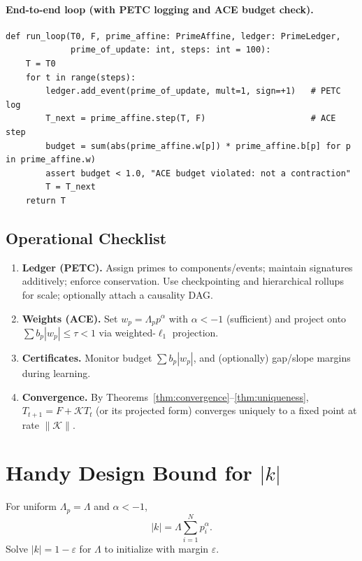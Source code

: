 \documentclass[11pt]{article}
\theoremstyle{plain}
\theoremstyle{definition}
\theoremstyle{remark}
\begin{document}
\paragraph{End-to-end loop (with PETC logging and ACE budget check).}
\begin{verbatim}
def run_loop(T0, F, prime_affine: PrimeAffine, ledger: PrimeLedger,
             prime_of_update: int, steps: int = 100):
    T = T0
    for t in range(steps):
        ledger.add_event(prime_of_update, mult=1, sign=+1)   # PETC log
        T_next = prime_affine.step(T, F)                     # ACE step
        budget = sum(abs(prime_affine.w[p]) * prime_affine.b[p] for p in prime_affine.w)
        assert budget < 1.0, "ACE budget violated: not a contraction"
        T = T_next
    return T
\end{verbatim}

\subsection{Operational Checklist}
\begin{enumerate}
  \item \textbf{Ledger (PETC).} Assign primes to components/events; maintain signatures additively; enforce conservation. Use checkpointing and hierarchical rollups for scale; optionally attach a causality DAG.
  \item \textbf{Weights (ACE).} Set $w_p=\Lambda_p p^\alpha$ with $\alpha< -1$ (sufficient) and project onto $\sum b_p|w_p|\le\tau<1$ via weighted-$\ell_1$ projection.
  \item \textbf{Certificates.} Monitor budget $\sum b_p|w_p|$, and (optionally) gap/slope margins during learning.
  \item \textbf{Convergence.} By Theorems~\ref{thm:convergence}–\ref{thm:uniqueness}, $T_{t+1}=F+\mathcal{K}T_t$ (or its projected form) converges uniquely to a fixed point at rate $\|\mathcal{K}\|$.
\end{enumerate}

\appendix
\section{Handy Design Bound for $|k|$}\label{app:design-bound}
For uniform $\Lambda_p=\Lambda$ and $\alpha<-1$,
\begin{equation*}
  |k|=\Lambda \sum_{i=1}^{N}p_i^{\alpha}.
\end{equation*}
Solve $|k|=1-\varepsilon$ for $\Lambda$ to initialize with margin $\varepsilon$.
\end{document}
